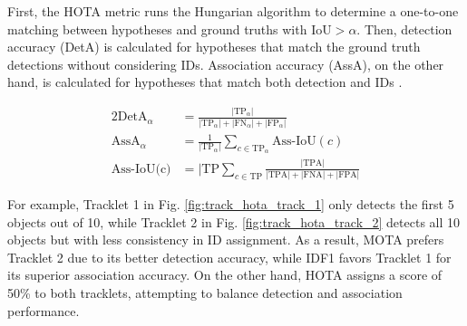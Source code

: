 First, the HOTA metric runs the Hungarian algorithm to determine a one-to-one matching between hypotheses and ground truths with $\text{IoU} > \alpha$. Then, detection accuracy (DetA) is calculated for hypotheses that match the ground truth detections without considering IDs. Association accuracy (AssA), on the other hand, is calculated for hypotheses that match both detection and IDs \citep{luiten2021hota}.

\begin{alignat}{2}
    \text{DetA}_{\alpha} &= \frac{|\text{TP}_{\alpha}|}{|\text{TP}_\alpha| + |\text{FN}_\alpha| + |\text{FP}_\alpha|} \\
    \text{AssA}_{\alpha} &= \frac{1}{|\text{TP}_\alpha|} \sum_{c \in \text{TP}_\alpha} \text{Ass-IoU}(c) \\
    \text{Ass-IoU(c)} &= {|\text{TP}}\sum_{c \in \text{TP}} \frac{|\text{TPA}|}{|\text{TPA}|+|\text{FNA}| + |\text{FPA}|}
\end{alignat}


For example, Tracklet 1 in Fig. \ref{fig:track_hota_track_1} only detects the first 5 objects out of 10, while Tracklet 2 in Fig. \ref{fig:track_hota_track_2} detects all 10 objects but with less consistency in ID assignment. As a result, MOTA prefers Tracklet 2 due to its better detection accuracy, while IDF1 favors Tracklet 1 for its superior association accuracy. On the other hand, HOTA assigns a score of 50\% to both tracklets, attempting to balance detection and association performance.

